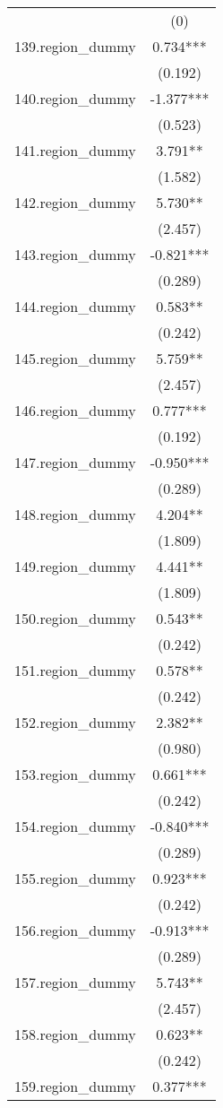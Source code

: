 \documentclass[]{article}
\begin{document}
\begin{tabular}{lc}
 & (0) \\
139.region\_dummy & 0.734*** \\
 & (0.192) \\
140.region\_dummy & -1.377*** \\
 & (0.523) \\
141.region\_dummy & 3.791** \\
 & (1.582) \\
142.region\_dummy & 5.730** \\
 & (2.457) \\
143.region\_dummy & -0.821*** \\
 & (0.289) \\
144.region\_dummy & 0.583** \\
 & (0.242) \\
145.region\_dummy & 5.759** \\
 & (2.457) \\
146.region\_dummy & 0.777*** \\
 & (0.192) \\
147.region\_dummy & -0.950*** \\
 & (0.289) \\
148.region\_dummy & 4.204** \\
 & (1.809) \\
149.region\_dummy & 4.441** \\
 & (1.809) \\
150.region\_dummy & 0.543** \\
 & (0.242) \\
151.region\_dummy & 0.578** \\
 & (0.242) \\
152.region\_dummy & 2.382** \\
 & (0.980) \\
153.region\_dummy & 0.661*** \\
 & (0.242) \\
154.region\_dummy & -0.840*** \\
 & (0.289) \\
155.region\_dummy & 0.923*** \\
 & (0.242) \\
156.region\_dummy & -0.913*** \\
 & (0.289) \\
157.region\_dummy & 5.743** \\
 & (2.457) \\
158.region\_dummy & 0.623** \\
 & (0.242) \\
159.region\_dummy & 0.377*** \\

\end{tabular}
\end{document}
